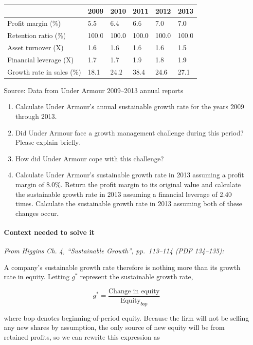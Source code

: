 \documentclass[11pt,a4paper]{article}
\begin{document}
{\def\LTcaptype{none} %
\begin{longtable}[]{@{}llllll@{}}
\toprule\noalign{}
& 2009 & 2010 & 2011 & 2012 & 2013 \\
\midrule\noalign{}
\endhead
\bottomrule\noalign{}
\endlastfoot
Profit margin (\%) & 5.5 & 6.4 & 6.6 & 7.0 & 7.0 \\
Retention ratio (\%) & 100.0 & 100.0 & 100.0 & 100.0 & 100.0 \\
Asset turnover (X) & 1.6 & 1.6 & 1.6 & 1.6 & 1.5 \\
Financial leverage (X) & 1.7 & 1.7 & 1.9 & 1.8 & 1.9 \\
Growth rate in sales (\%) & 18.1 & 24.2 & 38.4 & 24.6 & 27.1 \\
\end{longtable}
}

Source: Data from Under Armour 2009--2013 annual reports

\begin{enumerate}
\def\labelenumi{\alph{enumi}.}
\item
  Calculate Under Armour's annual sustainable growth rate for the years 2009 through 2013.
\item
  Did Under Armour face a growth management challenge during this period? Please explain briefly.
\item
  How did Under Armour cope with this challenge?
\item
  Calculate Under Armour's sustainable growth rate in 2013 assuming a profit margin of 8.0\%. Return
  the profit margin to its original value and calculate the sustainable growth rate in 2013 assuming
  a financial leverage of 2.40 times. Calculate the sustainable growth rate in 2013 assuming both of
  these changes occur.
\end{enumerate}

\paragraph{Context needed to solve it}

\emph{From Higgins Ch. 4, ``Sustainable Growth'', pp.~113--114 (PDF 134--135):}

A company's sustainable growth rate therefore is nothing more than its growth rate in equity.
Letting \(g^*\) represent the sustainable growth rate,

\[g^* = \frac{\text{Change in equity}}{\text{Equity}_{bop}}\]

where bop denotes beginning-of-period equity. Because the firm will not be selling any new shares by
assumption, the only source of new equity will be from retained profits, so we can rewrite this
expression as
\end{document}
